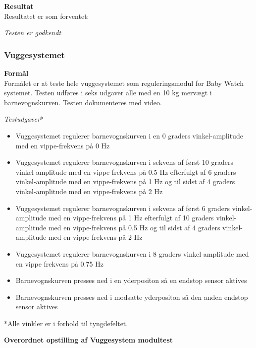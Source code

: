 
\textbf{Resultat} \\
Resultatet er som forventet:

\textit{Testen er godkendt}

\subsubsection{Vuggesystemet}
\textbf{Formål} \\
Formålet er at teste hele vuggesystemet som reguleringsmodul for Baby Watch systemet. Testen udføres i seks udgaver alle med en 10 kg mervægt i barnevognskurven. Testen dokumenteres med video.

\textit{Testudgaver}*
\begin{itemize}
	\item Vuggesystemet regulerer barnevognskurven i en 0 graders vinkel-amplitude med en vippe-frekvens på 0 Hz
	\item Vuggesystemet regulerer barnevognskurven i sekvens af først 10 graders vinkel-amplitude med en vippe-frekvens på 0.5 Hz efterfulgt af 6 graders vinkel-amplitude med en vippe-frekvens på 1 Hz og til sidst af 4 graders vinkel-amplitude med en vippe-frekvens på 2 Hz
	\item Vuggesystemet regulerer barnevognskurven i sekvens af først 6 graders vinkel-amplitude med en vippe-frekvens på 1 Hz efterfulgt af 10 graders vinkel-amplitude med en vippe-frekvens på 0.5 Hz og til sidst af 4 graders vinkel-amplitude med en vippe-frekvens på 2 Hz
	\item Vuggesystemet regulerer barnevognskurven i 8 graders vinkel amplitude med en vippe frekvens på 0.75 Hz
	\item Barnevognskurven presses ned i en yderpositon så en endstop sensor aktives
	\item Barnevognskurven presses ned i modsatte yderpositon så den anden endstop sensor aktives
\end{itemize}
*Alle vinkler er i forhold til tyngdefeltet.


\textbf{Overordnet opstilling af Vuggesystem modultest}

